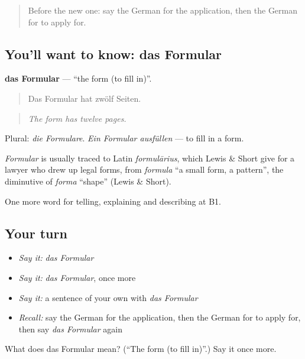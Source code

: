 \begin{quote}
Before the new one: say the German for the application, then the German for to apply for.
\end{quote}

\subsection*{You'll want to know: das Formular}
\textbf{das Formular} — \textquotedblleft{}the form (to fill in)\textquotedblright{}.

\begin{quote}
Das Formular hat zwölf Seiten.
\end{quote}

\begin{quote}
\emph{The form has twelve pages.}
\end{quote}

Plural: \emph{die Formulare}. \emph{Ein Formular ausfüllen} — to fill in a form.

\begin{cousinweb}
\emph{Formular} is usually traced to Latin \emph{formulārius}, which Lewis \& Short give for a lawyer who drew up legal forms, from \emph{formula} \textquotedblleft{}a small form, a pattern\textquotedblright{}, the diminutive of \emph{forma} \textquotedblleft{}shape\textquotedblright{} (Lewis \& Short).
\end{cousinweb}

\begin{grammarlens}[title={What you've built}]
One more word for telling, explaining and describing at B1.
\end{grammarlens}

\subsection*{Your turn}
\begin{itemize}
\raggedright
  \item \emph{Say it:} \emph{das Formular}
  \item \emph{Say it:} \emph{das Formular}, once more
  \item \emph{Say it:} a sentence of your own with \emph{das Formular}
  \item \emph{Recall:} say the German for the application, then the German for to apply for, then say \emph{das Formular} again
\end{itemize}

\begin{tcolorbox}[breakable,colback=teal!4,colframe=teal!35!black,title={Before you move on}]
What does das Formular mean? (\textquotedblleft{}The form (to fill in)\textquotedblright{}.) Say it once more.
\end{tcolorbox}
